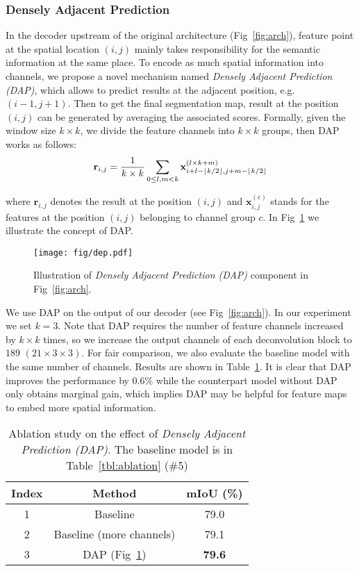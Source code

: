 \documentclass[runningheads]{llncs}
\DeclarePairedDelimiter\floor{\lfloor}{\rfloor}
\begin{document}
\subsubsection{Densely Adjacent Prediction}

In the decoder upstream of the original architecture (Fig~\ref{fig:arch}), feature point at the spatial location $(i, j)$ mainly takes responsibility for the semantic information at the same place. To encode as much spatial information into channels, we propose a novel mechanism named \emph{Densely Adjacent Prediction (DAP)}, which allows to predict results at the adjacent position, e.g. $(i-1, j+1)$. Then to get the final segmentation map, result at the position $(i, j)$ can be generated by averaging the associated scores. Formally, given the window size $k\times k$, we divide the feature channels into $k\times k$ groups, then {DAP} works as follows:
\begin{equation}
\mathbf{r}_{i,j} = \frac{1}{k\times k}\sum _{0\leq l,m<k} \mathbf{x}_{i+l-\floor*{k/2}, j+m-\floor*{k/2}}^{(l\times k+m)}
\end{equation}

where $\mathbf{r}_{i,j}$ denotes the result at the position $(i, j)$ and $\mathbf{x}_{i,j}^{(c)}$ stands for the features at the position $(i, j)$ belonging to channel group $c$. In Fig~\ref{fig:dap} we illustrate the concept of DAP.
\begin{figure}[htbp]
	\centering
	\texttt{[image: fig/dep.pdf]}
	\caption{Illustration of \emph{Densely Adjacent Prediction (DAP)} component in Fig~\ref{fig:arch}.}
	\label{fig:dap}
\end{figure}


We use DAP on the output of our decoder (see Fig~\ref{fig:arch}). In our experiment we set $k=3$. Note that DAP requires the number of feature channels increased by $k\times k$ times, so we increase the output channels of each deconvolution block to $189$ $(21\times 3\times 3)$. For fair comparison, we also evaluate the baseline model with the same number of channels. Results are shown in Table~\ref{tbl:dap}. It is clear that DAP improves the performance by $0.6\%$ while the counterpart model without DAP only obtains marginal gain, which implies DAP may be helpful for feature maps to embed more spatial information.

\begin{table}[h]

\begin{center}
\begin{tabular}{c|c|c}
\hline
Index & Method  & mIoU (\%) \\
\hline 1 & Baseline & 79.0 \\
\hline
2 & Baseline (more channels) & 79.1\\
\hline
3 & DAP (Fig~\ref{fig:dap})  & \textbf{79.6}\\
\hline
\end{tabular}
\end{center}
\caption{Ablation study on the effect of \emph{Densely Adjacent Prediction (DAP)}. The baseline model is in Table~\ref{tbl:ablation} (\#5)}

\label{tbl:dap}
\end{table}
\end{document}

